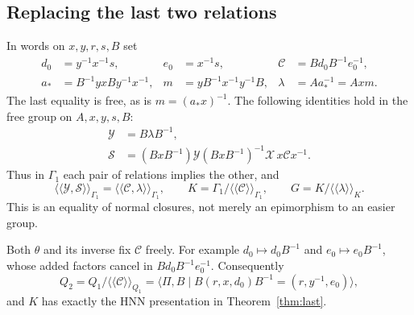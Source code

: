 \documentclass[11pt]{amsart}
\theoremstyle{definition}
\theoremstyle{remark}
\newcommand{\nc}[1]{\langle\!\langle #1\rangle\!\rangle}
\begin{document}
\subsection{Replacing the last two relations}
In words on $x,y,r,s,B$ set
\begin{equation}\label{eq:CL-words}
\begin{aligned}
 d_0&=y^{-1}x^{-1}s,&e_0&=x^{-1}s,&
 \mathcal C&=Bd_0B^{-1}e_0^{-1},\\
 a_*&=B^{-1}yxBy^{-1}x^{-1},&
 m&=yB^{-1}x^{-1}y^{-1}B,&
 \lambda&=Aa_*^{-1}=Axm.
\end{aligned}
\end{equation}
The last equality is free, as is $m=(a_*x)^{-1}$.
The following identities hold in the free group on $A,x,y,s,B$:
\begin{equation}\label{eq:two-rows}
\begin{aligned}
 \mathcal Y&=B\lambda B^{-1},\\
 \mathcal S&=(BxB^{-1})\mathcal Y(BxB^{-1})^{-1}
                 \mathcal X\,x\mathcal Cx^{-1}.
\end{aligned}
\end{equation}
Thus in $\Gamma_1$ each pair of relations implies the other,
and
\begin{equation}\label{eq:final-quotient}
 \nc{\mathcal Y,\mathcal S}_{\Gamma_1}
     =\nc{\mathcal C,\lambda}_{\Gamma_1},\qquad
 K=\Gamma_1/\nc{\mathcal C}_{\Gamma_1},\qquad
 G=K/\nc{\lambda}_K.
\end{equation}
This is an equality of normal closures, not merely an epimorphism
to an easier group.

Both $\theta$ and its inverse fix $\mathcal C$ freely. For example
$d_0\mapsto d_0B^{-1}$ and $e_0\mapsto e_0B^{-1}$, whose added
factors cancel in $Bd_0B^{-1}e_0^{-1}$. Consequently
\begin{equation}\label{eq:Q2}
 Q_2=Q_1/\nc{\mathcal C}_{Q_1}
   =\langle\Pi,B\mid B(r,x,d_0)B^{-1}=(r,y^{-1},e_0)\rangle,
\end{equation}
and $K$ has exactly the HNN presentation in
Theorem~\ref{thm:last}.
\end{document}
